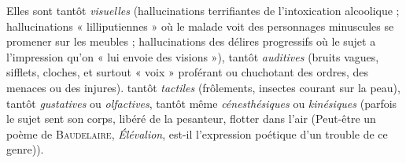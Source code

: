\vspace{0.24cm}
{\footnotesize 
Elles sont tantôt {\it visuelles} (hallucinations terrifiantes de l’intoxication
alcoolique ; hallucinations « lilliputiennes » où le malade voit des personnages
minuscules se promener sur les meubles ; hallucinations des délires
progressifs où le sujet a l'impression qu’on « lui envoie des visions »), tantôt {\it
auditives} (bruits vagues, sifflets, cloches, et surtout « voix » proférant ou
chuchotant des ordres, des menaces ou des injures). tantôt {\it tactiles} (frôlements,
insectes courant sur la peau), tantôt {\it gustatives} ou {\it olfactives}, tantôt
même {\it cénesthésiques} ou {\it kinésiques} (parfois le sujet sent son corps, libéré
de la pesanteur, flotter dans l’air
{\scriptsize (Peut-être un poème de \textsc{Baudelaire}, {\it Élévalion}, est-il l'expression poétique d’un
trouble de ce genre)}).}
\vspace{0.31cm}

